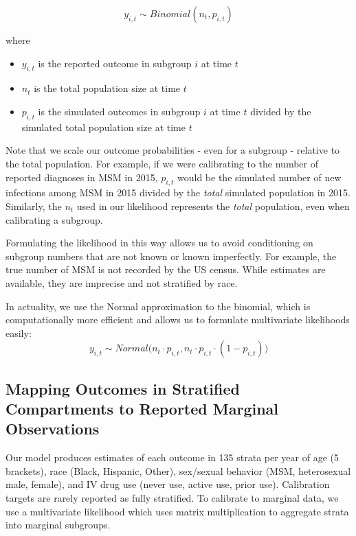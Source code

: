 \documentclass{article}
\begin{document}
\begin{equation}
	y_{i,t} \sim Binomial(n_t, p_{i,t})
\end{equation}

where
\begin{itemize}
	\item $y_{i,t}$ is the reported outcome in subgroup $i$ at time $t$
	\item $n_t$ is the total population size at time $t$
	\item $p_{i,t}$ is the simulated outcomes in subgroup $i$ at time $t$ divided by the simulated total population size at time $t$
\end{itemize}

Note that we scale our outcome probabilities - even for a subgroup - relative to the total population. For example, if we were calibrating to the number of reported diagnoses in MSM in 2015, $p_{i,t}$ would be the simulated number of new infections among MSM in 2015 divided by the \textit{total} simulated population in 2015. Similarly, the $n_t$ used in our likelihood represents the \textit{total} population, even when calibrating a subgroup.

Formulating the likelihood in this way allows us to avoid conditioning on subgroup numbers that are not known or known imperfectly. For example, the true number of MSM is not recorded by the US census. While estimates are available, they are imprecise and not stratified by race.

In actuality, we use the Normal approximation to the binomial, which is computationally more efficient and allows us to formulate multivariate likelihoods easily:
\begin{equation}
	y_{i,t} \sim Normal\Big(n_t \cdot p_{i,t}, n_t \cdot p_{i,t} \cdot (1-p_{i,t}) \Big)
\end{equation}

\subsection{Mapping Outcomes in Stratified Compartments to Reported Marginal Observations}\label{likelihood_mapping}

Our model produces estimates of each outcome in 135 strata per year of age (5 brackets), race (Black, Hispanic, Other), sex/sexual behavior (MSM, heterosexual male, female), and IV drug use (never use, active use, prior use). Calibration targets are rarely reported as fully stratified. To calibrate to marginal data, we use a multivariate likelihood which uses matrix multiplication to aggregate strata into marginal subgroups.
\end{document}
